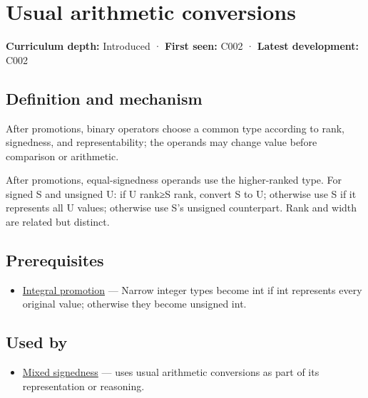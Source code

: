 \hypertarget{appendix-5e2d663adf7f}{}\label{referencestart:appendix-5e2d663adf7f}
\section{Usual arithmetic conversions}\label{appendix-5e2d663adf7f-usual-arithmetic-conversions}

\textbf{Curriculum depth:} Introduced · \textbf{First seen:} C002 · \textbf{Latest development:} C002

\begin{allmightroledefinition}

\subsection{Definition and mechanism}\label{appendix-5e2d663adf7f-definition-and-mechanism}

After promotions, binary operators choose a common type according to rank, signedness, and representability; the operands may change value before comparison or arithmetic.

\end{allmightroledefinition}

After promotions, equal-signedness operands use the higher-ranked type. For signed S and unsigned U: if U rank≥S rank, convert S to U; otherwise use S if it represents all U values; otherwise use S's unsigned counterpart. Rank and width are related but distinct.

\subsection{Prerequisites}\label{appendix-5e2d663adf7f-prerequisites}

\begin{itemize}
\tightlist
\item
  \hyperref[appendix-45303d03796a]{Integral promotion} --- Narrow integer types become int if int represents every original value; otherwise they become unsigned int.
\end{itemize}

\subsection{Used by}\label{appendix-5e2d663adf7f-used-by}

\begin{itemize}
\tightlist
\item
  \hyperref[appendix-736a2345de4a]{Mixed signedness} --- uses usual arithmetic conversions as part of its representation or reasoning.
\end{itemize}

